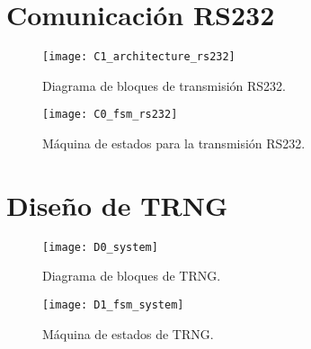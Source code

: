     \section{Comunicación RS232}

        \begin{figure}[hbtp]
            \caption{Diagrama de bloques de transmisión RS232.}
            \centering
            \texttt{[image: C1\_architecture\_rs232]}
            \label{fig:C1_architecture_rs232}
        \end{figure}

        \begin{figure}[hbtp]
            \caption{Máquina de estados para la transmisión RS232.}
            \centering
            \texttt{[image: C0\_fsm\_rs232]}
            \label{fig:C0_fsm_rs232}
        \end{figure}	

    \section{Diseño de TRNG}

        \begin{figure}[hbtp]
            \caption{Diagrama de bloques de TRNG.}
            \centering
            \texttt{[image: D0\_system]}
            \label{fig:D0_system}
        \end{figure}

        \begin{figure}[hbtp]
            \caption{Máquina de estados de TRNG.}
            \centering
            \texttt{[image: D1\_fsm\_system]}
            \label{fig:D1_fsm_system}
        \end{figure}

